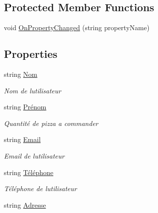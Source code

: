 \subsection*{Protected Member Functions}
\begin{DoxyCompactItemize}
\item 
void \hyperlink{classModele_1_1Utilisateur_a19ff1cdd2811be2589e2e160ad0b5181}{On\+Property\+Changed} (string property\+Name)
\end{DoxyCompactItemize}
\subsection*{Properties}
\begin{DoxyCompactItemize}
\item 
string \hyperlink{classModele_1_1Utilisateur_a2aa56cab9101d6c24445d3d6e1a7640d}{Nom}
\begin{DoxyCompactList}\small\item\em Nom de l\textquotesingle{}utilisateur \end{DoxyCompactList}\item 
string \hyperlink{classModele_1_1Utilisateur_a8be63c78df8f6d3bbeb8f6ceb7197975}{Prénom}
\begin{DoxyCompactList}\small\item\em Quantité de pizza a commander \end{DoxyCompactList}\item 
string \hyperlink{classModele_1_1Utilisateur_a1250bfe957225a47f96f31e5d0c1d305}{Email}
\begin{DoxyCompactList}\small\item\em Email de l\textquotesingle{}utilisateur \end{DoxyCompactList}\item 
string \hyperlink{classModele_1_1Utilisateur_ac0addebdc1b4733d0b0447f6a22b81c9}{Téléphone}
\begin{DoxyCompactList}\small\item\em Téléphone de l\textquotesingle{}utilisateur \end{DoxyCompactList}\item 
string \hyperlink{classModele_1_1Utilisateur_ad757f35a1187212cec5bb285e5a0e0ca}{Adresse}

\end{DoxyCompactItemize}
